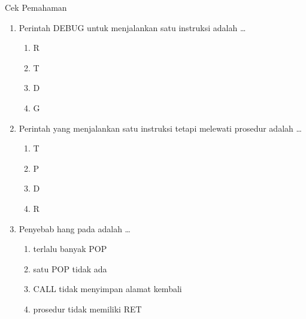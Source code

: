 \documentclass[aspectratio=169,11pt]{beamer}
\begin{document}
\begin{frame}{Cek Pemahaman}
\footnotesize
\begin{enumerate}
    \item Perintah DEBUG untuk menjalankan satu instruksi adalah
          \dots
          \begin{enumerate}
              \item R \quad \item T \quad \item D \quad \item G
          \end{enumerate}

    \vspace{0.2em}
    \item Perintah yang menjalankan satu instruksi tetapi melewati
          prosedur adalah \dots
          \begin{enumerate}
              \item T \quad \item P \quad \item D \quad \item R
          \end{enumerate}

    \vspace{0.2em}
    \item Penyebab hang pada  adalah \dots
          \begin{enumerate}
              \item terlalu banyak POP
              \item satu POP tidak ada
              \item CALL tidak menyimpan alamat kembali
              \item prosedur tidak memiliki RET
          \end{enumerate}
\end{enumerate}
\end{frame}
\end{document}
